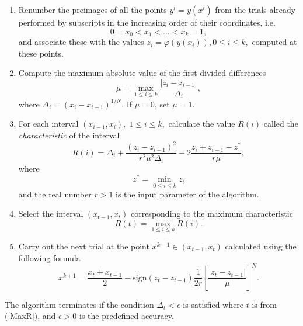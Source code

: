 \documentclass[runningheads]{llncs}
\begin{document}
\begin{enumerate}
	\item 
	Renumber the preimages of all the points $y^i=y(x^i)$
	from the trials already performed  	
by subscripts in the increasing order of their coordinates, i.e.
\begin{equation}\label{x_i}
0=x_0<x_1<\dots <x_k=1,
\end{equation}
and associate these with the values $z_i=\varphi(y(x_i)), 0\leq i \leq k,$ 
computed at these points.
\item
Compute the maximum absolute value of the first divided differences
\begin{equation}\label{mu}
\mu = \max_{1 \leq i \leq k}\frac{\left|z_i-z_{i-1}\right|}{\Delta_i},
\end{equation}
where $\Delta_i=\left(x_i-x_{i-1}\right)^{1/N}$. If $\mu = 0$, set $\mu = 1$.
\item
For each interval $(x_{i-1}, x_i), \; 1\leq i \leq k,$  calculate the value 
$R(i)$ called the \textit{characteristic} of the interval
\begin{equation}\label{R}
R(i)=\Delta_i+\frac{(z_i-z_{i-1})^2}{r^2\mu^2\Delta_i}-2\frac{z_i+z_{i-1}-z^*}{r\mu},
\end{equation}
where 
\begin{equation}\label{z}
z^*= \min_{0\leq i\leq k}z_i
\end{equation} 
and the real number $r>1$ is 
the input parameter of the algorithm.
\item 
Select the interval $(x_{t-1},x_t)$ corresponding to the maximum characteristic
\begin{equation}\label{MaxR}
R(t)= \max_{1 \leq i \leq k}R(i).
\end{equation}
\item
Carry out the next trial at the point $x^{k+1}\in(x_{t-1},x_t)$ calculated using
the following formula
\begin{equation}\label{xk1}
x^{k+1} = \frac{x_t+x_{t-1}}{2} - \mathrm{sign}(z_t-z_{t-1})\frac{1}{2r}
\left[\frac{\left|z_t-z_{t-1}\right|}{\mu}\right]^N.
\end{equation}
\end{enumerate}

The algorithm terminates if the condition $\Delta_t < \epsilon$ is satisfied
where $t$ is from (\ref{MaxR}), and $\epsilon>0$ is the predefined accuracy. 
\end{document}
